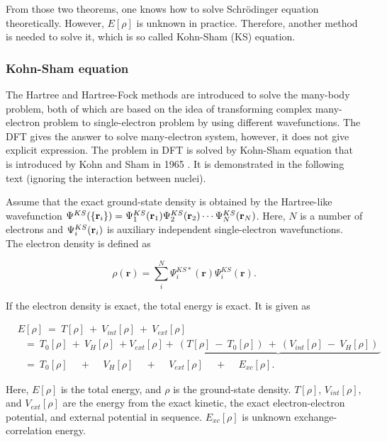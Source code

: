 \documentclass[a4paper, 12pt, titlepage,oneside,drop]{kthesis}
\begin{document}
From those two theorems, one knows how to solve Schrödinger equation theoretically. However, $E[\rho]$ is unknown in practice. Therefore, another method is needed to solve it, which is so called Kohn-Sham (KS) equation.

\subsubsection{Kohn-Sham equation}

The Hartree and Hartree-Fock methods are introduced to solve the many-body problem, both of which are based on the idea of transforming complex 
many-electron problem to single-electron problem by using different wavefunctions. The DFT gives the answer to solve many-electron system, however, it does not give explicit expression.
The problem in DFT is solved by Kohn-Sham equation that is introduced by Kohn and Sham in 1965 \cite{kohn1965self}. It is demonstrated in the following text (ignoring the interaction between nuclei).

Assume that the exact ground-state density is obtained by the Hartree-like wavefunction $\wfks = \bwf<1><1> \bwf<2><2> \cdots \bwf<N><N>$. Here, $N$ is a number of electrons and $\bwf<i><i>$ is auxiliary independent
single-electron wavefunctions. The electron density is defined as

\begin{equation}\label{ks1}
 \rho(\textbf{r}) = \sum\limits_i^{N} {\Psi^{{KS}*}_{i}(\textbf{r})} {\Psi^{{KS}}_{i}(\textbf{r})}.
\end{equation}

If the electron density is exact, the total energy is exact. It is given as

\begin{equation}\label{kse}
\begin{split}
&E[\rho] \ =\ T[\rho] \ + \ V_{int}[\rho] \ + \ V_{ext}[\rho]  \\
&\ \ \   = \ T_{0}[\rho] \ + \ V_{H}[\rho] \ + V_{ext}[\rho]+\underbrace{\ (T[\rho] \ - \ T_{0}[\rho]) \ + \  (V_{int}[\rho] \ - \ V_{H}[\rho])\ }       \\
&\ \ \   = \ T_{0}[\rho] \quad \,  + \quad \,  V_{H}[\rho] \quad \, + \quad \, V_{ext}[\rho] \quad \, + \quad \, E_{xc}[\rho].
\end{split}
\end{equation}

Here, $E[\rho]$  is the total energy, and $\rho$ is the ground-state density. $T[\rho]$, $V_{int}[\rho]$, and $V_{ext}[\rho]$ are the energy from the exact kinetic, 
the exact electron-electron potential, and external potential in sequence. $E_{xc}[\rho]$ is unknown exchange-correlation energy.
\end{document}
